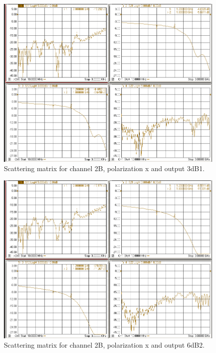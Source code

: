 \documentclass[12pt,a4paper,oneside]{article}
\begin{document}
\begin{figure}[H]
\centering
\includegraphics[width=0.9\linewidth]{VNA_results/2Bx_3dB1.png}
\caption{Scattering matrix for channel 2B, polarization x and output 3dB1.}
\label{fig:2Bx_3dB1}
\end{figure}


\begin{figure}[H]
\centering
\includegraphics[width=0.9\linewidth]{VNA_results/2Bx_6dB2.png}
\caption{Scattering matrix for channel 2B, polarization x and output 6dB2.}
\label{fig:2Bx_6dB2}
\end{figure}
\end{document}
